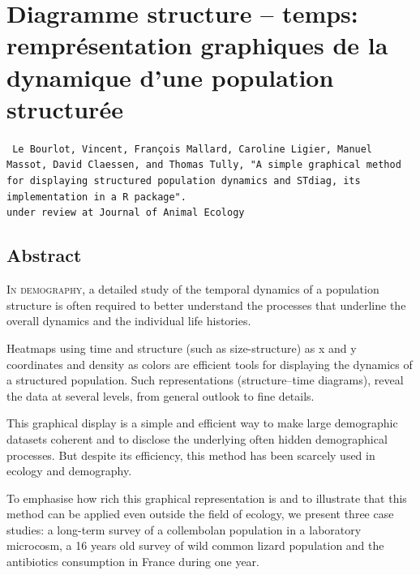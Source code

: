 \chapter[Diagramme structure -- temps: remprésentation graphiques de la
dynamique d'une population structurée][Diagramme structure -- temps]{Diagramme structure -- temps: remprésentation graphiques de la
dynamique d'une population structurée}\label{Chap:STDiag}

\vspace{4cm}

\begin{Spacing}{1}
\texttt{
Le Bourlot, Vincent, François Mallard, Caroline Ligier, Manuel Massot, 
David Claessen, and Thomas Tully, "A simple graphical method for 
displaying structured population dynamics and STdiag, its implementation 
in a R package".\\
under review at Journal of Animal Ecology
}
\end{Spacing}

\section*{Abstract}

  
  \lettrine[lines=3]{I}{n demography}, a detailed study of the temporal dynamics
  of a population structure is often required to better understand the processes that
  underline the overall dynamics and the individual life histories.
  
  Heatmaps using time and structure (such as size-structure) as x and y
  coordinates and density as colors are efficient tools for displaying the
  dynamics of a structured population. Such representations (structure--time
  diagrams), reveal the data at several levels, from general outlook to fine
  details.
  
  This graphical display is a simple and efficient way to make large
  demographic datasets coherent and to disclose the underlying often hidden
  demographical processes. But despite its efficiency, this method has been
  scarcely used in ecology and demography.
  
  To emphasise how rich this graphical representation is and to illustrate
  that this method can be applied even outside the field of ecology, we present
  three case studies:  a long-term survey of a collembolan population in a
  laboratory microcosm, a 16 years old survey of wild common lizard population and
  the antibiotics consumption in France during one year.
  

